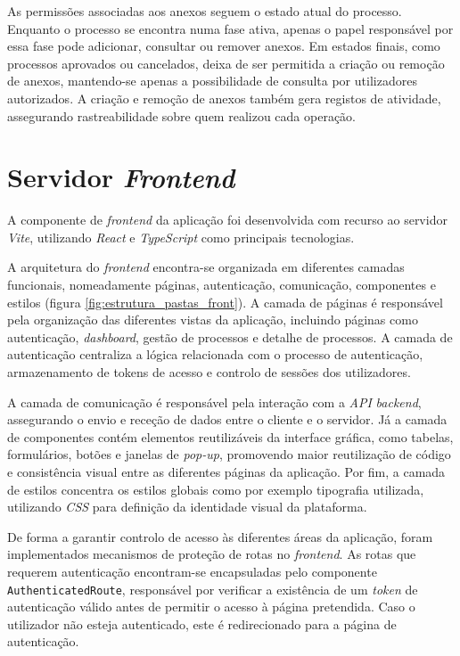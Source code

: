 As permissões associadas aos anexos seguem o estado atual do processo. Enquanto o processo se encontra numa fase ativa, apenas o papel responsável por essa fase pode adicionar, consultar ou remover anexos. Em estados finais, como processos aprovados ou cancelados, deixa de ser permitida a criação ou remoção de anexos, mantendo-se apenas a possibilidade de consulta por utilizadores autorizados. A criação e remoção de anexos também gera registos de atividade, assegurando rastreabilidade sobre quem realizou cada operação.

\section{Servidor \textit{Frontend}} \label{sec:frontend-server}

A componente de \textit{frontend} da aplicação foi desenvolvida com recurso ao servidor \textit{Vite}\cite{vite-dev}, utilizando \textit{React}\cite{react-docs} e \textit{TypeScript}\cite{typescript-lang} como principais tecnologias.

A arquitetura do \textit{frontend} encontra-se organizada em diferentes camadas funcionais, nomeadamente páginas, autenticação, comunicação, componentes e estilos (figura \ref{fig:estrutura_pastas_front}). A camada de páginas é responsável pela organização das diferentes vistas da aplicação, incluindo páginas como autenticação, \textit{dashboard}, gestão de processos e detalhe de processos. A camada de autenticação centraliza a lógica relacionada com o processo de autenticação, armazenamento de tokens de acesso e controlo de sessões dos utilizadores.

A camada de comunicação é responsável pela interação com a \textit{API} \textit{backend}, assegurando o envio e receção de dados entre o cliente e o servidor. Já a camada de componentes contém elementos reutilizáveis da interface gráfica, como tabelas, formulários, botões e janelas de \textit{pop-up}, promovendo maior reutilização de código e consistência visual entre as diferentes páginas da aplicação. Por fim, a camada de estilos concentra os estilos globais como por exemplo tipografia utilizada, utilizando \textit{CSS} para definição da identidade visual da plataforma.

De forma a garantir controlo de acesso às diferentes áreas da aplicação, foram implementados mecanismos de proteção de rotas no \textit{frontend}. As rotas que requerem autenticação encontram-se encapsuladas pelo componente \texttt{AuthenticatedRoute}, responsável por verificar a existência de um \textit{token} de autenticação válido antes de permitir o acesso à página pretendida. Caso o utilizador não esteja autenticado, este é redirecionado para a página de autenticação.

